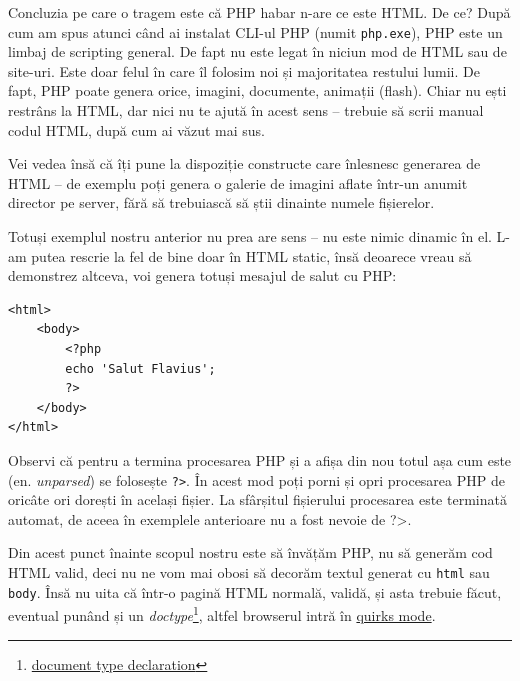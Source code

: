 Concluzia pe care o tragem este că PHP habar n-are ce este HTML. De ce?
După cum am spus atunci când ai instalat CLI-ul PHP (numit \texttt{php.exe}),
PHP este un limbaj de scripting general. De fapt nu este legat în niciun mod de
HTML sau de site-uri. Este doar felul în care îl folosim noi și majoritatea
restului lumii. De fapt, PHP poate genera orice, imagini, documente, animații
(flash). Chiar nu ești restrâns la HTML, dar nici nu te ajută în acest sens --
trebuie să scrii manual codul HTML, după cum ai văzut mai sus.

Vei vedea însă că îți pune la dispoziție constructe care înlesnesc generarea
de HTML -- de exemplu poți genera o galerie de imagini aflate într-un anumit
director pe server, fără să trebuiască să știi dinainte numele fișierelor.

Totuși exemplul nostru anterior nu prea are sens -- nu este nimic dinamic în el.
L-am putea rescrie la fel de bine doar în HTML static, însă deoarece
vreau să demonstrez altceva, voi genera totuși mesajul de salut cu PHP:
\begin{lstlisting}
<html>
	<body>
		<?php
		echo 'Salut Flavius';
		?>
	</body>
</html>
\end{lstlisting}

Observi că pentru a termina procesarea PHP și a afișa din nou totul
așa cum este (en. \textsl{unparsed}) se folosește \texttt{?>}.
În acest mod poți porni și opri procesarea PHP de oricâte ori dorești în același fișier.
La sfârșitul fișierului procesarea este terminată automat, de aceea în exemplele
anterioare nu a fost nevoie de {\glqq}?>{\grqq}.


Din acest punct înainte scopul nostru este să învățăm PHP, nu să generăm
cod HTML valid, deci nu ne vom mai obosi să decorăm textul generat
cu \texttt{html} sau \texttt{body}. Însă nu uita că într-o pagină HTML
normală, validă, și asta trebuie făcut, eventual
punând și un
\textsl{doctype}\footnote{
\href{http://en.wikipedia.org/wiki/Document_Type_Declaration}{document type declaration}}, altfel
browserul intră în \href{http://en.wikipedia.org/wiki/Quirks_mode}{quirks mode}.

